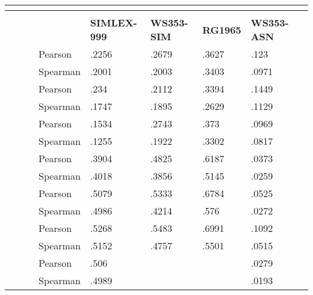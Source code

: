 \begin{table}
 \centering
 \begin{ThreePartTable} 
\begin{tabularx}{\textwidth}{p{3cm} *{2}{p{.5cm}} *{2}{p{1.7cm}} *{4}{L}} 
 \\
 \toprule
  &  &  &   &  &  \\
 & & & & \small{\textbf{SIMLEX-999}} & \small{\textbf{WS353-SIM}} & \small{\textbf{RG1965}} & \small{\textbf{WS353-ASN}} \\
 \toprule
  &  &  & Pearson & .2256 & .2679 & .3627 & .123 \\
 & & & Spearman & .2001 & .2003 & .3403 & .0971 \\
 
  &  &  & Pearson & .234 & .2112 & .3394 & .1449 \\
 & & & Spearman & .1747 & .1895 & .2629 & .1129 \\
  
  &  &  & Pearson & .1534 & .2743 & .373 & .0969 \\
 & & & Spearman & .1255 & .1922 & .3302 & .0817 \\
  
  &  &  & Pearson & .3904 & .4825 & .6187 & .0373 \\
 & & & Spearman & .4018 & .3856 & .5145 & .0259 \\
  
  &  &  & Pearson & .5079 & .5333 & .6784 & .0525 \\
 & & & Spearman & .4986 & .4214 & .576 & .0272 \\
  
  &  &  & Pearson & .5268 & .5483 & .6991 & .1092 \\
 & & & Spearman & .5152 & .4757 & .5501 & .0515 \\
  &   &  & Pearson & .506 & & & .0279 \\
 & & & Spearman & .4989 & & & .0193 \\


\end{tabularx}
\end{ThreePartTable}
\end{table}
